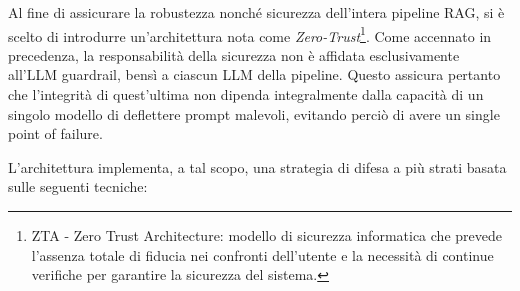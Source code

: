 Al fine di assicurare la robustezza nonché sicurezza dell'intera pipeline RAG, si è scelto di introdurre un'architettura nota come \textit{Zero-Trust}\footnote{ZTA - Zero Trust Architecture: modello di sicurezza informatica che prevede l'assenza totale di fiducia nei confronti dell'utente e la necessità di continue verifiche per garantire la sicurezza del sistema.}. Come accennato in precedenza, la responsabilità della sicurezza non è affidata esclusivamente all'LLM guardrail, bensì a ciascun LLM della pipeline. Questo assicura pertanto che l'integrità di quest'ultima non dipenda integralmente dalla capacità di un singolo modello di deflettere prompt malevoli, evitando perciò di avere un single point of failure. 

L'architettura implementa, a tal scopo, una strategia di difesa a più strati basata sulle seguenti tecniche:


